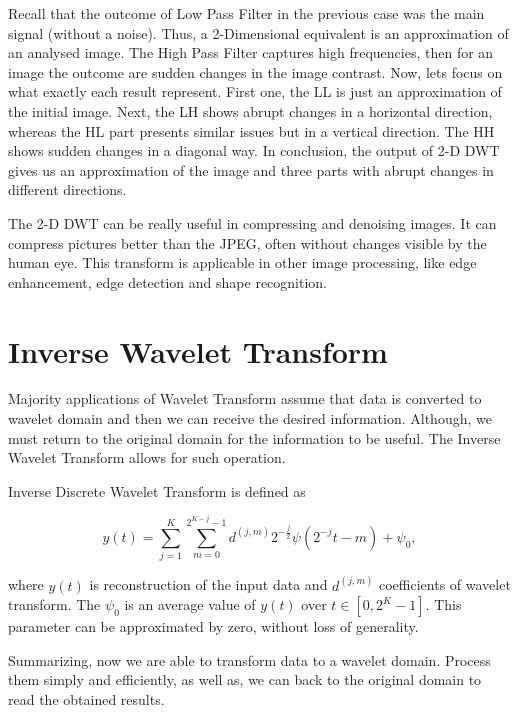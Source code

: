 Recall that the outcome of Low Pass Filter in the previous case was the main signal (without a noise). Thus, a 2-Dimensional equivalent is an approximation of an analysed image. The High Pass Filter captures high frequencies, then for an image the outcome are sudden changes in the image contrast. Now, lets focus on what exactly each result represent. First one, the LL is just an approximation of the initial image. Next, the LH shows abrupt changes in a horizontal direction, whereas the HL part presents similar issues but in a vertical direction. The HH shows sudden changes in a diagonal way. In conclusion, the output of 2-D DWT gives us an approximation of the image and three parts with abrupt changes in different directions.

The 2-D DWT can be really useful in compressing and denoising images. It can compress pictures better than the JPEG, often without changes visible by the human eye. This transform is applicable in other image processing, like edge enhancement, edge detection and shape recognition.


\section{Inverse Wavelet Transform}

Majority applications of Wavelet Transform assume that data is converted to wavelet domain and then we can receive the desired information. Although, we must return to the original domain for the information to be useful. The Inverse Wavelet Transform allows for such operation.

\begin{defn}
Inverse Discrete Wavelet Transform is defined as

\begin{equation}
y(t) = \sum_{j=1}^{K} \sum_{m=0}^{2^{K-j}-1} d^{(j,m)} 2^{-\frac{j}{2}} \psi\left(2^{-j}t - m\right) + \psi_0,
\end{equation}

where $y(t)$ is reconstruction of the input data and $d^{(j,m)}$ coefficients of wavelet transform. The $\psi_0$ is an average value of $y(t)$ over $t \in [0, 2^K-1]$. This parameter can be approximated by zero, without loss of generality.
\end{defn}

Summarizing, now we are able to transform data to a wavelet domain. Process them simply and efficiently, as well as, we can back to the original domain to read the obtained results.
